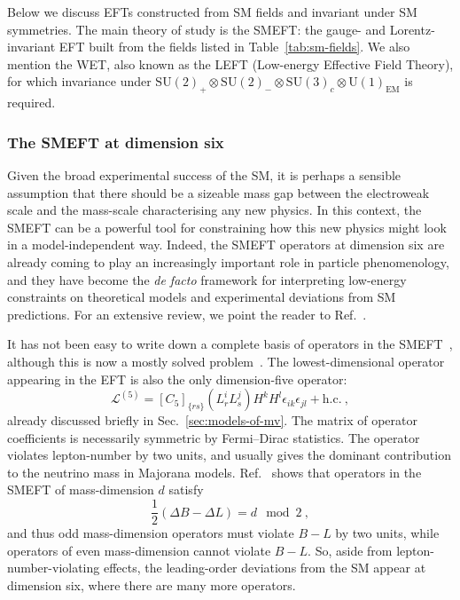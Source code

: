 Below we discuss EFTs constructed from SM fields and invariant under SM
symmetries. The main theory of study is the SMEFT: the gauge- and
Lorentz-invariant EFT built from the fields listed in Table~\ref{tab:sm-fields}.
We also mention the WET, also known as the LEFT (Low-energy Effective Field
Theory), for which invariance under
$\mathrm{SU}(2)_{+} \otimes \mathrm{SU}(2)_{-} \otimes \mathrm{SU}(3)_{c} \otimes \mathrm{U}(1)_{\text{EM}}$
is required.

\subsubsection{The SMEFT at dimension six}

Given the broad experimental success of the SM, it is perhaps a sensible
assumption that there should be a sizeable mass gap between the electroweak
scale and the mass-scale characterising any new physics. In this context, the
SMEFT can be a powerful tool for constraining how this new physics might look in
a model-independent way. Indeed, the SMEFT operators at dimension six are
already coming to play an increasingly important role in particle phenomenology,
and they have become the \textit{de facto} framework for interpreting low-energy
constraints on theoretical models and experimental deviations from SM
predictions. For an extensive review, we point the reader to
Ref.~\cite{Brivio:2017vri}.

It has not been easy to write down a complete basis of operators in the
SMEFT~\cite{Buchmuller:1985jz, Grzadkowski:2010es}, although this is now a
mostly solved problem~\cite{Lehman:2015via, Henning:2015daa, Lehman:2015coa,
  Henning:2015alf, Henning:2017fpj}. The lowest-dimensional operator appearing
in the EFT is also the only dimension-five operator:
\begin{equation}
  \mathscr{L}^{(5)} = [C_{5}]_{\{rs\}} (L^{i}_{r} L^{j}_{s}) H^{k} H^{l} \epsilon_{ik} \epsilon_{jl} + \text{h.c.} \ ,
\end{equation}
already discussed briefly in Sec.~\ref{sec:models-of-mv}. The matrix of operator
coefficients is necessarily symmetric by Fermi--Dirac statistics. The operator
violates lepton-number by two units, and usually gives the dominant contribution
to the neutrino mass in Majorana models. Ref.~\cite{Kobach:2016ami} shows that
operators in the SMEFT of mass-dimension $d$ satisfy
\begin{equation}
  \frac{1}{2} (\Delta B - \Delta L) = d \mod 2 \ ,
\end{equation}
and thus odd mass-dimension operators must violate $B - L$ by two units, while
operators of even mass-dimension cannot violate $B - L$. So, aside from
lepton-number-violating effects, the leading-order deviations from the SM appear
at dimension six, where there are many more operators.

